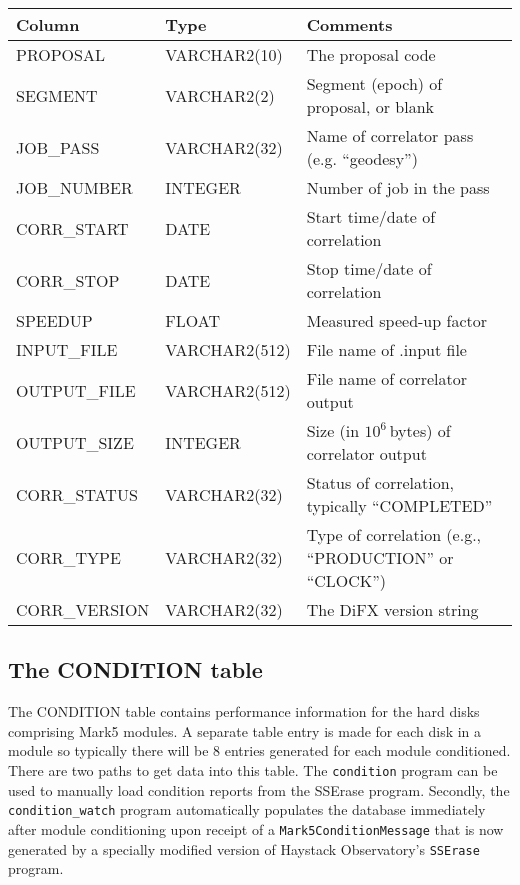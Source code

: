 \begin{center}
\begin{tabular}{lll}
\hline
\hline
   \multicolumn{1}{l}{Column}
 & \multicolumn{1}{l}{Type}
 & \multicolumn{1}{l}{Comments}
\\
\hline
PROPOSAL	& VARCHAR2(10)	& The proposal code \\
SEGMENT		& VARCHAR2(2)	& Segment (epoch) of proposal, or blank \\
JOB\_PASS	& VARCHAR2(32)	& Name of correlator pass (e.g. ``geodesy'') \\
JOB\_NUMBER	& INTEGER	& Number of job in the pass \\
CORR\_START	& DATE		& Start time/date of correlation \\
CORR\_STOP	& DATE		& Stop time/date of correlation \\
SPEEDUP         & FLOAT         & Measured speed-up factor \\
INPUT\_FILE     & VARCHAR2(512) & File name of .input file \\
OUTPUT\_FILE	& VARCHAR2(512)	& File name of correlator output \\
OUTPUT\_SIZE	& INTEGER	& Size (in $10^6$\,bytes) of correlator output \\
CORR\_STATUS	& VARCHAR2(32)	& Status of correlation, typically ``COMPLETED'' \\
CORR\_TYPE      & VARCHAR2(32)  & Type of correlation (e.g., ``PRODUCTION'' or ``CLOCK'') \\
CORR\_VERSION   & VARCHAR2(32)  & The DiFX version string \\
\hline
\end{tabular}
\end{center}

\subsection{The CONDITION table}

The CONDITION table contains performance information for the hard disks comprising Mark5 modules.
A separate table entry is made for each disk in a module so typically there will be 8 entries generated for each module conditioned.
There are two paths to get data into this table.
The {\tt condition} program can be used to manually load condition reports from the SSErase program.
Secondly, the {\tt condition\_watch} program automatically populates the database immediately after module conditioning upon receipt of a {\tt Mark5ConditionMessage} that is now generated by a specially modified version of Haystack Observatory's {\tt SSErase} program.

